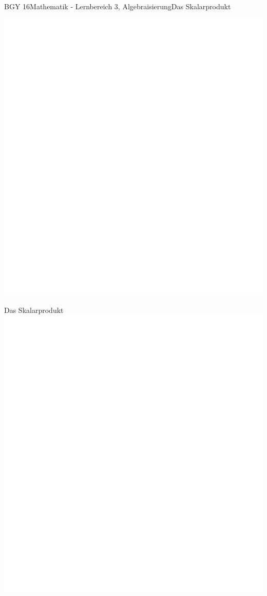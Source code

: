 \documentclass[oneside,openany,headings=optiontotoc,11pt,numbers=noenddot]{scrreprt}
\begin{document}
\begin{worksheet}{BGY 16}{Mathematik - Lernbereich 3, Algebraisierung}{Das Skalarprodukt}
\begin{framed}
			\includegraphics[height=0.6\textheight]{../empty.jpg}
		\end{framed}
		\begin{framed}
			\color{codegray}\tiny Das Skalarprodukt\\
			\includegraphics[height=0.3\textheight]{../empty.jpg}
		\end{framed}
		
	\end{worksheet}
\end{document}
